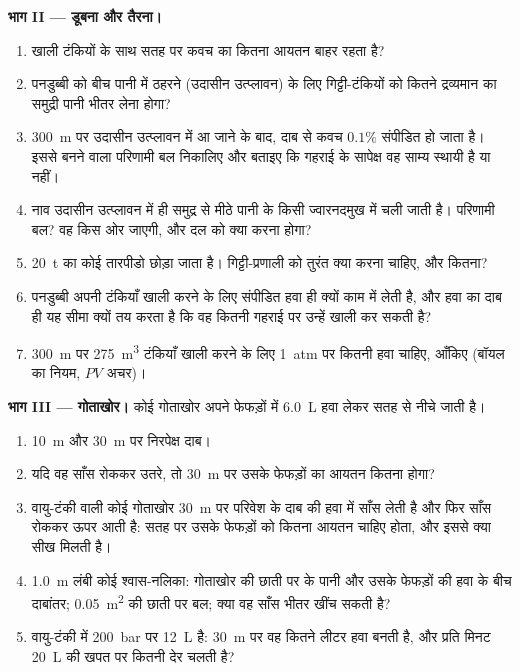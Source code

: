 \begin{problem}
\medskip
\noindent\textbf{भाग II --- डूबना और तैरना।}
\begin{enumerate}[resume]
  \item खाली टंकियों के साथ सतह पर कवच का कितना आयतन बाहर रहता है?
  \item पनडुब्बी को बीच पानी में ठहरने (उदासीन उत्प्लावन) के लिए
        गिट्टी-टंकियों को कितने द्रव्यमान का समुद्री पानी भीतर लेना होगा?
  \item \qty{300}{m} पर उदासीन उत्प्लावन में आ जाने के बाद, दाब से कवच
        $0.1\%$ संपीडित हो जाता है। इससे बनने वाला परिणामी बल निकालिए और
        बताइए कि गहराई के सापेक्ष वह साम्य स्थायी है या नहीं।
  \item नाव उदासीन उत्प्लावन में ही समुद्र से मीठे पानी के किसी
        ज्वारनदमुख में चली जाती है। परिणामी बल? वह किस ओर जाएगी, और दल को
        क्या करना होगा?
  \item \qty{20}{t} का कोई तारपीडो छोड़ा जाता है। गिट्टी-प्रणाली को तुरंत
        क्या करना चाहिए, और कितना?
  \item पनडुब्बी अपनी टंकियाँ खाली करने के लिए संपीडित हवा ही क्यों काम
        में लेती है, और हवा का दाब ही यह सीमा क्यों तय करता है कि वह
        कितनी गहराई पर उन्हें खाली कर सकती है?
  \item \qty{300}{m} पर \qty{275}{m^3} टंकियाँ खाली करने के लिए \qty{1}{atm}
        पर कितनी हवा चाहिए, आँकिए (बॉयल का नियम, $PV$
        अचर)।
\end{enumerate}

\medskip
\noindent\textbf{भाग III --- गोताखोर।}
कोई गोताखोर अपने फेफड़ों में \qty{6.0}{L} हवा लेकर सतह से नीचे जाती है।
\begin{enumerate}[resume]
  \item \qty{10}{m} और \qty{30}{m} पर निरपेक्ष दाब।
  \item यदि वह साँस रोककर उतरे, तो \qty{30}{m} पर उसके फेफड़ों का आयतन
        कितना होगा?
  \item वायु-टंकी वाली कोई गोताखोर \qty{30}{m} पर परिवेश के दाब की हवा
        में साँस लेती है और फिर साँस रोककर ऊपर आती है: सतह पर उसके
        फेफड़ों को कितना आयतन चाहिए होता, और इससे क्या सीख मिलती है।
  \item \qty{1.0}{m} लंबी कोई श्वास-नलिका: गोताखोर की छाती पर के पानी और
        उसके फेफड़ों की हवा के बीच दाबांतर; \qty{0.05}{m^2} की छाती पर
        बल; क्या वह साँस भीतर खींच सकती है?
  \item वायु-टंकी में \qty{200}{bar} पर \qty{12}{L} है: \qty{30}{m} पर वह
        कितने लीटर हवा बनती है, और प्रति मिनट \qty{20}{L} की खपत पर कितनी
        देर चलती है?
\end{enumerate}


\end{problem}
